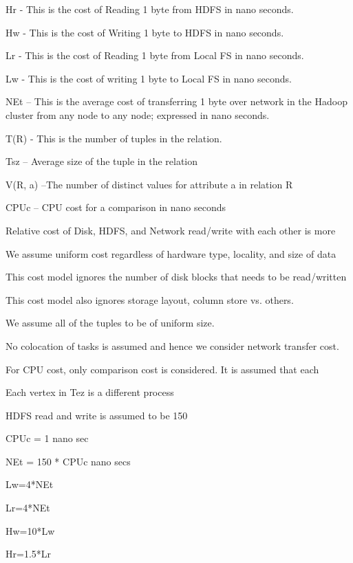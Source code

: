 \documentclass{vldb}
\newcommand{\ii}{\item}
\begin{document}
\ii Hr - This is the cost of Reading 1 byte from HDFS in nano seconds.
\ii Hw - This is the cost of Writing 1 byte to HDFS in nano seconds.
\ii Lr - This is the cost of Reading 1 byte from Local FS in nano seconds.
\ii Lw - This is the cost of writing 1 byte to Local FS in nano seconds.
\ii NEt – This is the average cost of transferring 1 byte over network in the Hadoop cluster from any node to any node; expressed in nano seconds.
\ii T(R) - This is the number of tuples in the relation.
\ii Tsz – Average size of the tuple in the relation
\ii V(R, a) –The number of distinct values for attribute a in relation R
\ii CPUc – CPU cost for a comparison in nano seconds
\ii Relative cost of Disk, HDFS, and Network read/write with each other is more
\ii We assume uniform cost regardless of hardware type, locality, and size of data
\ii This cost model ignores the number of disk blocks that needs to be read/written
\ii This cost model also ignores storage layout, column store vs. others.
\ii We assume all of the tuples to be of uniform size.
\ii No colocation of tasks is assumed and hence we consider network transfer cost.
\ii For CPU cost, only comparison cost is considered. It is assumed that each
\ii Each vertex in Tez is a different process
\ii HDFS read and write is assumed to be 150%
\ii CPUc = 1 nano sec
\ii NEt = 150 * CPUc nano secs
\ii Lw=4*NEt
\ii Lr=4*NEt
\ii Hw=10*Lw
\ii Hr=1.5*Lr
\end{document}

